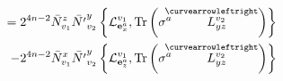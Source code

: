 \documentclass[12pt]{article}
\newcommand{\nn}{\nonumber}
\def\cl{{\cal L}}
\begin{document}
\begin{appendix}
\begin{eqnarray}
%
%
%
%
&&\hspace{4cm} =
 2^{4n-2} \bar{N}_{v_1}^z  \bar{N'}_{v_2}^y \left\{        \cl^{v_1}_{{\bf e}^a_x}    , \mbox{Tr} \left( \sigma^a  \stackrel{\hspace{-3mm}\curvearrowleftright}{L^{v_2}_{yz}} \right) \right\}
 \nn\\
 &&\hspace{4cm}
-2^{4n-2} \bar{N}_{v_1}^x \bar{N'}_{v_2}^y \left\{        \cl^{v_1}_{{\bf e}^a_z}    , \mbox{Tr} \left( \sigma^a  \stackrel{\hspace{-3mm}\curvearrowleftright}{L^{v_2}_{yz}} \right) \right\}

\end{eqnarray}
\end{appendix}
\end{document}

